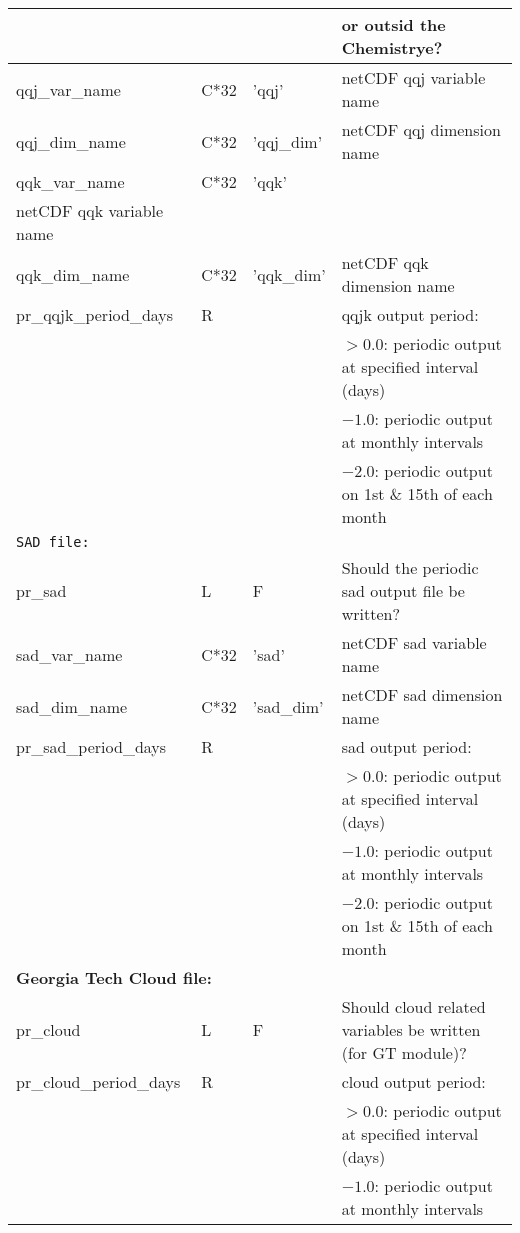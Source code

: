 {\begin{landscape}
\begin{center}
\begin{longtable}{|l|l|l|l|}
                     &   &   & or outsid the Chemistrye?  \\ \hline
qqj\_var\_name       & C*32& 'qqj' &  netCDF qqj variable name\\ \hline
qqj\_dim\_name       & C*32& 'qqj\_dim' &  netCDF qqj dimension name\\ \hline
qqk\_var\_name       & C*32& 'qqk' & \\  netCDF qqk variable name \\ \hline
qqk\_dim\_name       & C*32& 'qqk\_dim' &  netCDF qqk dimension name\\ \hline
pr\_qqjk\_period\_days & R &   & qqjk output period:  \\
                          &   &      & $>0.0$:  periodic output at specified interval (days)  \\
                          &   &      & $-1.0$:  periodic output at monthly intervals  \\
                          &   &      & $-2.0$:  periodic output on 1st \& 15th of each month  \\ \hline
\multicolumn{4}{|l|}{\tt SAD file:}  \\ \hline
pr\_sad           & L & F & Should the periodic sad  output file be written?  \\ \hline
sad\_var\_name       & C*32& 'sad' &  netCDF sad variable name\\ \hline
sad\_dim\_name       & C*32& 'sad\_dim' &  netCDF sad dimension name \\ \hline
pr\_sad\_period\_days & R &   & sad output period:  \\
                          &   &      & $>0.0$:  periodic output at specified interval (days)  \\
                          &   &      & $-1.0$:  periodic output at monthly intervals  \\
                          &   &      & $-2.0$:  periodic output on 1st \& 15th of each month  \\ \hline
\multicolumn{4}{|l|}{\bf Georgia Tech Cloud file: }  \\ \hline
  pr\_cloud         & L & F & Should cloud related variables be written (for GT module)?  \\ \hline
pr\_cloud\_period\_days & R &   & cloud output period:  \\
                          &   &      & $>0.0$:  periodic output at specified interval (days)  \\
                          &   &      & $-1.0$:  periodic output at monthly intervals  \\

\end{longtable}
\end{center}
\end{landscape}}
